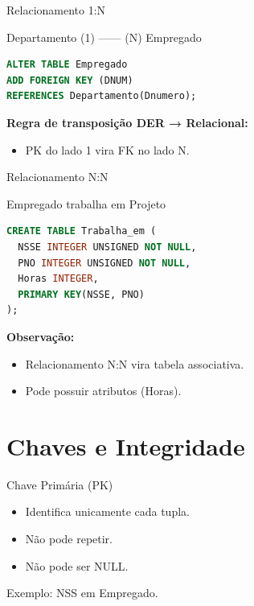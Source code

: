 \documentclass{beamer}
\begin{document}
\begin{frame}[fragile]{Relacionamento 1:N}

Departamento (1) —— (N) Empregado

\begin{lstlisting}[language=SQL]
ALTER TABLE Empregado
ADD FOREIGN KEY (DNUM)
REFERENCES Departamento(Dnumero);
\end{lstlisting}

\textbf{Regra de transposição DER → Relacional:}
\begin{itemize}
\item PK do lado 1 vira FK no lado N.
\end{itemize}

\end{frame}

\begin{frame}[fragile]{Relacionamento N:N}

Empregado trabalha em Projeto

\begin{lstlisting}[language=SQL]
CREATE TABLE Trabalha_em (
  NSSE INTEGER UNSIGNED NOT NULL,
  PNO INTEGER UNSIGNED NOT NULL,
  Horas INTEGER,
  PRIMARY KEY(NSSE, PNO)
);
\end{lstlisting}

\textbf{Observação:}
\begin{itemize}
\item Relacionamento N:N vira tabela associativa.
\item Pode possuir atributos (Horas).
\end{itemize}

\end{frame}

\section{Chaves e Integridade}

\begin{frame}{Chave Primária (PK)}

\begin{itemize}
\item Identifica unicamente cada tupla.
\item Não pode repetir.
\item Não pode ser NULL.
\end{itemize}

Exemplo: NSS em Empregado.
\end{frame}
\end{document}
